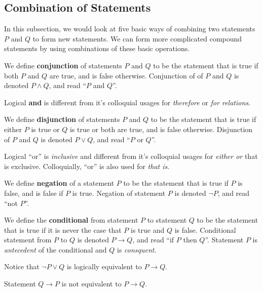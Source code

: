 \documentclass[]{article}
\begin{document}
\subsection{Combination of Statements }
In this subsection, we would look at five basic ways of combining two statements $P$ and $Q$ to form new statements. We can form more complicated compound statements by using combinations of these basic operations. 
\begin{defn}[Conjunction] We define \textbf{conjunction} of statements $P$ and $Q$ to be the statement that is true if both $P$ and $Q$ are true, and is false otherwise. Conjunction of of $P$ and $Q$ is denoted $P \wedge Q$, and read ``$P$ and $Q$''.
\end{defn}
\begin{rem} Logical \textbf{and} is different from it's colloquial usages for \emph{therefore} or \emph{for relations}.
\end{rem}	
\begin{defn}[Disjunction] We define \textbf{disjunction} of statements $P$ and $Q$ to be the statement that is true if either $P$ is true or $Q$ is true or both are true, and is false otherwise. Disjunction of $P$ and $Q$ is denoted $P \vee Q$, and read ``$P$ or $Q$''.
\end{defn}
\begin{rem} Logical ``or'' is \emph{inclusive} and different from it's colloquial usages for \emph{either or} that is exclusive. Colloquially, ``or'' is also used for \emph{that is}.
\end{rem}			
\begin{defn}[Negation] We define \textbf{negation} of a statement $P$ to be the statement that is true if $P$ is false, and is false if $P$ is true. Negation of statement $P$ is denoted $\neg P$, and read ``not $P$''.	
\end{defn}
\begin{defn}[Conditional] We define the \textbf{conditional} from statement $P$ to statement $Q$ to be the statement that is true if it is never the case that $P$ is true and $Q$ is false. Conditional statement from $P$ to $Q$ is denoted $P \rightarrow Q$, and read ``if $P$ then $Q$''.	Statement $P$ is \emph{antecedent} of the conditional and $Q$ is \emph{consquent}.	
\end{defn}
\begin{rem} Notice that $\neg P \vee Q$ is logically equivalent to $P \rightarrow Q$.
\end{rem}	
\begin{rem} Statement $Q \rightarrow P$ is not equivalent to $P \rightarrow Q$.
\end{rem}	
\end{document}
